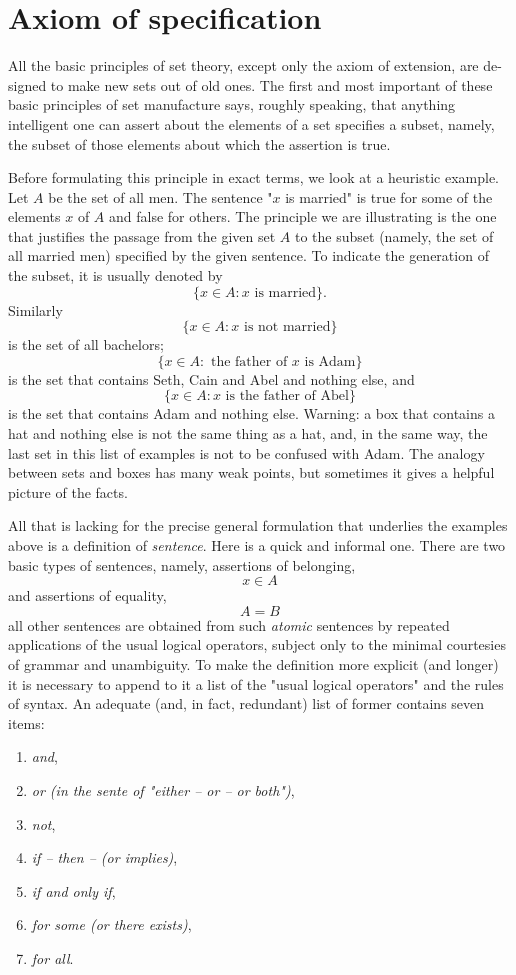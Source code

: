 \section{Axiom of specification}

All the basic principles of set theory, except only the axiom of extension, are de-
signed to make new sets out of old ones. The first and most important of these basic
principles of set manufacture says, roughly speaking, that anything intelligent one
can assert about the elements of a set specifies a subset, namely, the subset of those
elements about which the assertion is true. 

Before formulating this principle in exact terms, we look at a heuristic example. Let $A$ be the set of all men. The sentence "$x$ is married" is true for some of the elements $x$ of $A$ and false for others. The principle we are illustrating is the one that justifies the passage from the given set $A$ to the subset (namely, the set of all married men) specified by the given sentence. To indicate the generation of the subset, it is usually denoted by
\[
	\{ x \in A : x \text{ is married}\}.
\]
Similarly
\[
	\{ x \in A : x \text{ is not married}\}
\]
is the set of all bachelors;
\[
	\{ x \in A : \text{ the father of } x \text{ is Adam}\}
\]
is the set that contains Seth, Cain and Abel and nothing else, and
\[
	\{ x \in A: x \text{ is the father of Abel}\}
\]
is the set that contains Adam and nothing else. Warning: a box that contains a hat and nothing else is not the same thing as a hat, and, in the same way, the last set in this list of examples is not to be confused with Adam. The analogy between sets and boxes has many weak points, but sometimes it gives a helpful picture of the facts.

All that is lacking for the precise general formulation that underlies the examples above is a definition of \textit{sentence}. Here is a quick and informal one. There are two basic types of sentences, namely, assertions of belonging,
\[
	x \in A
\]
and assertions of equality,
\[
	A = B
\]
all other sentences are obtained from such \textit{atomic} sentences by repeated applications of the usual logical operators, subject only to the minimal courtesies of grammar and unambiguity. To make the definition more explicit (and longer) it is necessary to append to it a list of the "usual logical operators" and the rules of syntax. An adequate (and, in fact, redundant) list of former contains seven items:
\begin{enumerate}
	\item \textit{and},
	\item \textit{or (in the sente of "either -- or -- or both")},
	\item \textit{not},
	\item \textit{if -- then -- (or implies)},
	\item \textit{if and only if},
	\item \textit{for some (or there exists)},
	\item \textit{for all}.
\end{enumerate}

